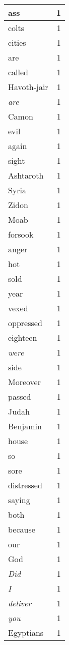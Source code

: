 \begin{center}
\begin{longtable}{l|r}
ass & 1\\ \hline 
colts & 1\\ \hline 
cities & 1\\ \hline 
are & 1\\ \hline 
called & 1\\ \hline 
Havoth-jair & 1\\ \hline 
\emph{are} & 1\\ \hline 
Camon & 1\\ \hline 
evil & 1\\ \hline 
again & 1\\ \hline 
sight & 1\\ \hline 
Ashtaroth & 1\\ \hline 
Syria & 1\\ \hline 
Zidon & 1\\ \hline 
Moab & 1\\ \hline 
forsook & 1\\ \hline 
anger & 1\\ \hline 
hot & 1\\ \hline 
sold & 1\\ \hline 
year & 1\\ \hline 
vexed & 1\\ \hline 
oppressed & 1\\ \hline 
eighteen & 1\\ \hline 
\emph{were} & 1\\ \hline 
side & 1\\ \hline 
Moreover & 1\\ \hline 
passed & 1\\ \hline 
Judah & 1\\ \hline 
Benjamin & 1\\ \hline 
house & 1\\ \hline 
so & 1\\ \hline 
sore & 1\\ \hline 
distressed & 1\\ \hline 
saying & 1\\ \hline 
both & 1\\ \hline 
because & 1\\ \hline 
our & 1\\ \hline 
God & 1\\ \hline 
\emph{Did} & 1\\ \hline 
\emph{I} & 1\\ \hline 
\emph{deliver} & 1\\ \hline 
\emph{you} & 1\\ \hline 
Egyptians & 1\\ \hline 

\end{longtable}
\end{center}
